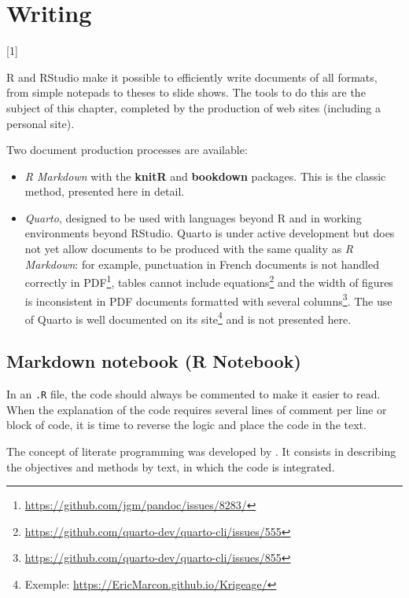 \documentclass[
  12pt,
  american,
  a4paper,
  extrafontsizes,onecolumn,openright
  ]{memoir}
\providecommand{\tightlist}{%
  \setlength{\itemsep}{0pt}\setlength{\parskip}{0pt}}
\newcommand{\toc}[1]{%
  \startcontents[chapters]%
  \printcontents[chapters]{}{1}[#1]{}%
  ~\newline%
}
\begin{document}
\chapter{Writing}\label{chap-rediger}

\toc{1}

R and RStudio make it possible to efficiently write documents of all formats, from simple notepads to theses to slide shows.
The tools to do this are the subject of this chapter, completed by the production of web sites (including a personal site).

Two document production processes are available:

\begin{itemize}
\tightlist
\item
  \emph{R Markdown} with the \textbf{knitR} and \textbf{bookdown} packages.
  This is the classic method, presented here in detail.
\item
  \emph{Quarto}, designed to be used with languages beyond R and in working environments beyond RStudio.
  Quarto is under active development but does not yet allow documents to be produced with the same quality as \emph{R Markdown}: for example, punctuation in French documents is not handled correctly in PDF\footnote{\url{https://github.com/jgm/pandoc/issues/8283/}}, tables cannot include equations\footnote{\url{https://github.com/quarto-dev/quarto-cli/issues/555}} and the width of figures is inconsistent in PDF documents formatted with several columns\footnote{\url{https://github.com/quarto-dev/quarto-cli/issues/855}}.
  The use of Quarto is well documented on its site\footnote{Exemple: \url{https://EricMarcon.github.io/Krigeage/}} and is not presented here.
\end{itemize}

\section{Markdown notebook (R Notebook)}\label{markdown-notebook-r-notebook}

In an \texttt{.R} file, the code should always be commented to make it easier to read.
When the explanation of the code requires several lines of comment per line or block of code, it is time to reverse the logic and place the code in the text.

The concept of literate programming was developed by \textcite{Knuth1984}.
It consists in describing the objectives and methods by text, in which the code is integrated.
\end{document}
